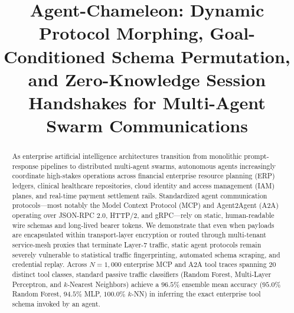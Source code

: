 \documentclass[conference,10pt]{IEEEtran}
\begin{document}
\title{Agent-Chameleon: Dynamic Protocol Morphing, Goal-Conditioned Schema Permutation, and Zero-Knowledge Session Handshakes for Multi-Agent Swarm Communications}

\author{
}

\maketitle

\begin{abstract}
As enterprise artificial intelligence architectures transition from monolithic prompt-response pipelines to distributed multi-agent swarms, autonomous agents increasingly coordinate high-stakes operations across financial enterprise resource planning (ERP) ledgers, clinical healthcare repositories, cloud identity and access management (IAM) planes, and real-time payment settlement rails. Standardized agent communication protocols---most notably the Model Context Protocol (MCP) and Agent2Agent (A2A) operating over JSON-RPC 2.0, HTTP/2, and gRPC---rely on static, human-readable wire schemas and long-lived bearer tokens. We demonstrate that even when payloads are encapsulated within transport-layer encryption or routed through multi-tenant service-mesh proxies that terminate Layer-7 traffic, static agent protocols remain severely vulnerable to statistical traffic fingerprinting, automated schema scraping, and credential replay. Across $N = 1{,}000$ enterprise MCP and A2A tool traces spanning $20$ distinct tool classes, standard passive traffic classifiers (Random Forest, Multi-Layer Perceptron, and $k$-Nearest Neighbors) achieve a $96.5\%$ ensemble mean accuracy ($95.0\%$ Random Forest, $94.5\%$ MLP, $100.0\%$ $k$-NN) in inferring the exact enterprise tool schema invoked by an agent.


\end{abstract}
\end{document}
